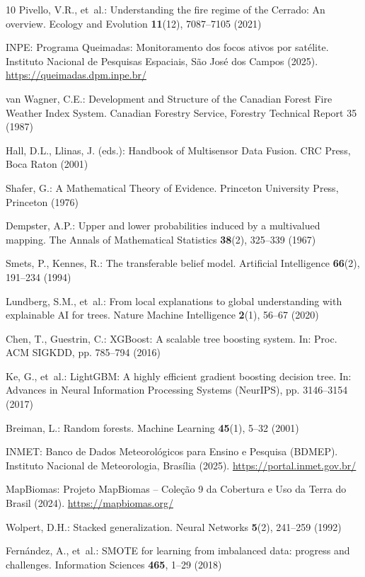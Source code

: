 \documentclass[runningheads]{llncs}
\begin{document}
\begin{thebibliography}{10}
Pivello, V.R., et~al.: Understanding the fire regime of the Cerrado: An overview. Ecology and Evolution \textbf{11}(12), 7087--7105 (2021)

INPE: Programa Queimadas: Monitoramento dos focos ativos por sat\'elite. Instituto Nacional de Pesquisas Espaciais, S\~ao Jos\'e dos Campos (2025). \url{https://queimadas.dpm.inpe.br/}

van Wagner, C.E.: Development and Structure of the Canadian Forest Fire Weather Index System. Canadian Forestry Service, Forestry Technical Report 35 (1987)

Hall, D.L., Llinas, J. (eds.): Handbook of Multisensor Data Fusion. CRC Press, Boca Raton (2001)

Shafer, G.: A Mathematical Theory of Evidence. Princeton University Press, Princeton (1976)

Dempster, A.P.: Upper and lower probabilities induced by a multivalued mapping. The Annals of Mathematical Statistics \textbf{38}(2), 325--339 (1967)

Smets, P., Kennes, R.: The transferable belief model. Artificial Intelligence \textbf{66}(2), 191--234 (1994)

Lundberg, S.M., et~al.: From local explanations to global understanding with explainable AI for trees. Nature Machine Intelligence \textbf{2}(1), 56--67 (2020)

Chen, T., Guestrin, C.: XGBoost: A scalable tree boosting system. In: Proc. ACM SIGKDD, pp. 785--794 (2016)

Ke, G., et~al.: LightGBM: A highly efficient gradient boosting decision tree. In: Advances in Neural Information Processing Systems (NeurIPS), pp. 3146--3154 (2017)

Breiman, L.: Random forests. Machine Learning \textbf{45}(1), 5--32 (2001)

INMET: Banco de Dados Meteorol\'ogicos para Ensino e Pesquisa (BDMEP). Instituto Nacional de Meteorologia, Bras\'ilia (2025). \url{https://portal.inmet.gov.br/}

MapBiomas: Projeto MapBiomas -- Cole\c{c}\~ao 9 da Cobertura e Uso da Terra do Brasil (2024). \url{https://mapbiomas.org/}

Wolpert, D.H.: Stacked generalization. Neural Networks \textbf{5}(2), 241--259 (1992)

Fern{\'a}ndez, A., et~al.: SMOTE for learning from imbalanced data: progress and challenges. Information Sciences \textbf{465}, 1--29 (2018)

\end{thebibliography}
\end{document}
